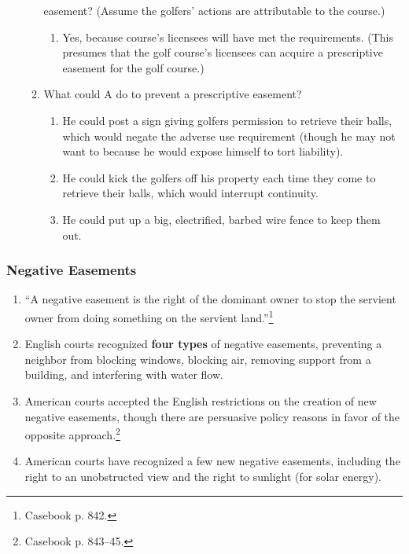 \begin{enumerate}
\begin{enumerate}
        easement? (Assume the golfers' actions are attributable to the 
        course.)
        \begin{enumerate}
            \item Yes, because course's licensees will have met the 
            requirements. (This presumes that the golf course's licensees can 
            acquire a prescriptive easement for the golf course.)
        \end{enumerate}
        \item What could A do to prevent a prescriptive easement?
        \begin{enumerate}
            \item He could post a sign giving golfers permission to retrieve 
            their balls, which would negate the adverse use requirement 
            (though he may not want to because he would expose himself to tort 
            liability).
            \item He could kick the golfers off his property each time they 
            come to retrieve their balls, which would interrupt continuity.
            \item He could put up a big, electrified, barbed wire fence to 
            keep them out.
      \end{enumerate}
    \end{enumerate}
\end{enumerate}

\subsubsection{Negative Easements}

\begin{enumerate}
    \item ``A negative easement is the right of the dominant owner to stop the 
    servient owner from doing something on the servient 
    land.''\footnote{Casebook p. 842.}
    \item English courts recognized \textbf{four types} of negative easements, 
    preventing a neighbor from blocking windows, blocking air, removing 
    support from a building, and interfering with water flow.
    \item American courts accepted the English restrictions on the creation of 
    new negative easements, though there are persuasive policy reasons in 
    favor of the opposite approach.\footnote{Casebook p. 843--45.}
    \item American courts have recognized a few new negative easements, 
    including the right to an unobstructed view and the right to sunlight (for 
    solar energy).
\end{enumerate}

